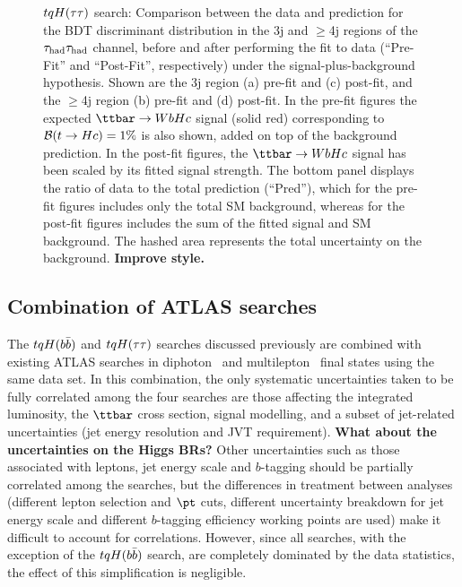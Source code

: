 \begin{figure}[htbp]
\begin{center}
\caption{\small{$tqH(\tau\tau)$ search: Comparison between the data and prediction for the BDT discriminant distribution in the 3j and $\geq$4j regions of 
the $\tau_{\mathrm{had}} \tau_{\mathrm{had}}$ channel, before and after performing the fit to data  (``Pre-Fit'' and ``Post-Fit'', respectively) under the signal-plus-background hypothesis.
Shown are the 3j region (a) pre-fit and (c) post-fit, and the $\geq$4j region (b) pre-fit and (d) post-fit.
In the pre-fit figures the expected $\Hc$ signal (solid red) corresponding to $\mathcal{B}(t\to Hc)=1\%$ is also shown,
added on top of the background prediction. In the post-fit figures, the $\Hc$ signal has been scaled by its fitted signal strength.
The bottom panel displays the ratio of data to the total prediction (``Pred''), which for the pre-fit figures includes only the total SM background,
whereas for the post-fit figures includes the sum of the fitted signal and SM background.
The hashed area represents the total uncertainty on the background. \textbf{Improve style.}}}
\label{fig:prepostfit_unblinded_WbHc_hh}
\end{center}
\end{figure}

\subsection{Combination of ATLAS searches}
\label{sec:results_combo}

The $tqH(b\bar{b})$ and $tqH(\tau\tau)$ searches discussed previously are combined with existing ATLAS searches in 
diphoton~\cite{Aaboud:2017mfd} and multilepton~\cite{Aaboud:2018pob} final states using the same data set. 
In this combination, the only systematic uncertainties taken to be fully correlated among the four searches are 
those affecting the integrated luminosity, the $\ttbar$ cross section, signal modelling, and a subset of jet-related uncertainties 
(jet energy resolution and JVT requirement). 
\textbf{What about the uncertainties on the Higgs BRs?}
Other uncertainties such as those associated with leptons,
jet energy scale and $b$-tagging should be partially correlated among the searches, but the differences in treatment 
between analyses (different lepton selection and $\pt$ cuts, different uncertainty breakdown for jet energy scale and 
different $b$-tagging efficiency working points are used) make it difficult to account for correlations. However, since all searches, 
with the exception of the $tqH(b\bar{b})$ search, are completely dominated by the data statistics, the effect of this simplification is negligible.

